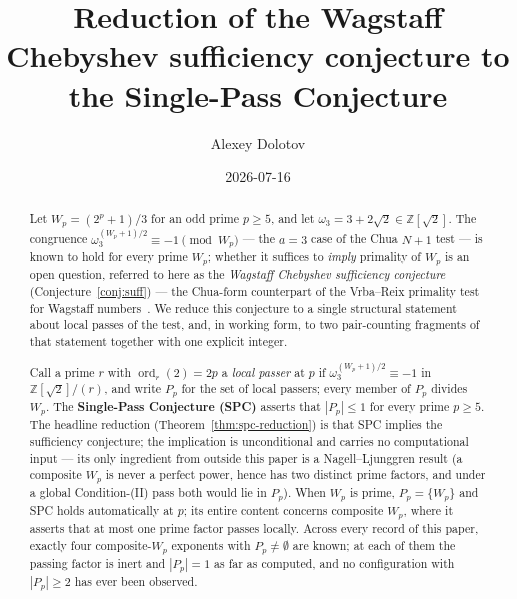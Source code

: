 \documentclass[11pt]{amsart}
\theoremstyle{plain}
\theoremstyle{definition}
\theoremstyle{remark}
\numberwithin{equation}{section}
\newcommand{\ord}{\operatorname{ord}}
\newcommand{\Z}{\mathbb{Z}}
\begin{document}
\title[Wagstaff Chebyshev reduction to SPC]{Reduction of the Wagstaff Chebyshev sufficiency conjecture to the Single-Pass Conjecture}

\author{Alexey Dolotov}
\date{2026-07-16}


\begin{abstract}
Let $W_p = (2^p + 1)/3$ for an odd prime $p \geq 5$, and let $\omega_3 = 3 + 2\sqrt{2} \in \Z[\sqrt 2]$. The congruence $\omega_3^{(W_p + 1)/2} \equiv -1 \pmod{W_p}$ --- the $a = 3$ case of the Chua $N + 1$ test --- is known to hold for every prime $W_p$; whether it suffices to \emph{imply} primality of $W_p$ is an open question, referred to here as the \emph{Wagstaff Chebyshev sufficiency conjecture} (Conjecture~\ref{conj:suff}) --- the Chua-form counterpart of the Vrba--Reix primality test for Wagstaff numbers~\cite{ref:VrbaReix}. We reduce this conjecture to a single structural statement about local passes of the test, and, in working form, to two pair-counting fragments of that statement together with one explicit integer.

Call a prime $r$ with $\ord_r(2) = 2p$ a \emph{local passer} at $p$ if $\omega_3^{(W_p+1)/2} \equiv -1$ in $\Z[\sqrt 2]/(r)$, and write $P_p$ for the set of local passers; every member of $P_p$ divides $W_p$. The \textbf{Single-Pass Conjecture (SPC)} asserts that $|P_p| \leq 1$ for every prime $p \geq 5$. The headline reduction (Theorem~\ref{thm:spc-reduction}) is that SPC implies the sufficiency conjecture; the implication is unconditional and carries no computational input --- its only ingredient from outside this paper is a Nagell--Ljunggren result (a composite $W_p$ is never a perfect power, hence has two distinct prime factors, and under a global Condition-(II) pass both would lie in $P_p$). When $W_p$ is prime, $P_p = \{W_p\}$ and SPC holds automatically at $p$; its entire content concerns composite $W_p$, where it asserts that at most one prime factor passes locally. Across every record of this paper, exactly four composite-$W_p$ exponents with $P_p \neq \emptyset$ are known; at each of them the passing factor is inert and $|P_p| = 1$ as far as computed, and no configuration with $|P_p| \geq 2$ has ever been observed.


\end{abstract}
\end{document}
